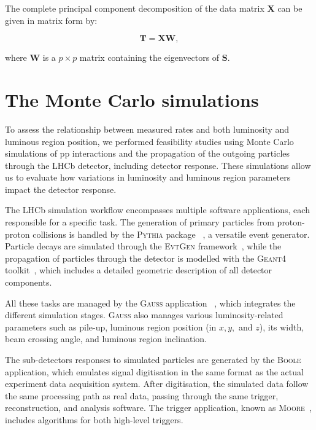 The complete principal component decomposition of the data matrix $\mathbf{X}$ can be given in matrix form by:

\begin{equation}
\mathbf{T} = \mathbf{X} \mathbf{W},
\end{equation}

where $\mathbf{W}$ is a $p \times p$ matrix containing the eigenvectors of $\mathbf{S}$.



\section{The Monte Carlo simulations}\label{sec:MC}
To assess the relationship between measured rates and both luminosity and luminous region position, we performed feasibility studies using Monte Carlo simulations of pp interactions and the propagation of the outgoing particles through the LHCb detector, including detector response. These simulations allow us to evaluate how variations in luminosity and luminous region parameters impact the detector response.

The LHCb simulation workflow encompasses multiple software applications, each responsible for a specific task. The generation of primary particles from proton-proton collisions is handled by the \textsc{Pythia} package ~\cite{Sj_strand_2006}, a versatile event generator. Particle decays are simulated through the \textsc{EvtGen} framework~\cite{Lange:2001uf}, while the propagation of particles through the detector is modelled with the \textsc{Geant4} toolkit~\cite{Agostinelli:2002hh}, which includes a detailed geometric description of all detector components.

All these tasks are managed by the \textsc{Gauss} application ~\cite{Miglioranzi:1322402}, which integrates the different simulation stages. \textsc{Gauss} also manages various luminosity-related parameters such as pile-up, luminous region position (in \(x, y,\) and \(z\)), its width, beam crossing angle, and luminous region inclination.

The sub-detectors responses to simulated particles are generated by the \textsc{Boole}~\cite{1462666} application, which emulates signal digitisation in the same format as the actual experiment data acquisition system. After digitisation, the simulated data follow the same processing path as real data, passing through the same trigger, reconstruction, and analysis software. The trigger application, known as \textsc{Moore}~\cite{moore}, includes algorithms for both high-level triggers. 

